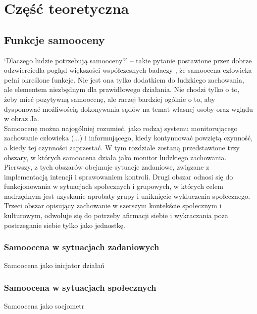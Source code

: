 \documentclass[man]{apa6}
\begin{document}
\section{Część teoretyczna}
\subsection{Funkcje samooceny}

`Dlaczego ludzie potrzebują samooceny?' -- takie pytanie postawione przez \textcite{pyszczynski2004people} dobrze odzwierciedla pogląd większości współczesnych badaczy \parencite[zob. również, ][]{bandura1994self, leary1995self}, że samoocena człowieka pełni określone funkcje. Nie jest ona tylko dodatkiem do ludzkiego zachowania, ale elementem niezbędnym dla prawidłowego działania. Nie chodzi tylko o to, żeby mieć pozytywną samoocenę, ale raczej bardziej ogólnie o to, aby dysponować możliwością dokonywania sądów na temat własnej osoby oraz wglądu w obraz Ja.\\
Samoocenę można najogólniej rozumieć, jako rodzaj systemu monitorującego zachowanie człowieka (...) i informującego, kiedy kontynuować powziętą czynność, a kiedy tej czynności zaprzestać. W tym rozdziale zostaną przedstawione trzy obszary, w których samoocena działa jako monitor ludzkiego zachowania. Pierwszy, z tych obszarów obejmuje sytuacje zadaniowe, związane z implementacją intencji i sprawowaniem kontroli. Drugi obszar odnosi się do funkcjonowania w sytuacjach społecznych i grupowych, w których celem nadrzędnym jest uzyskanie aprobaty grupy i uniknięcie wykluczenia społecznego. Trzeci obszar opisujący zachowanie w szerszym kontekście społecznym i kulturowym, odwołuje się do potrzeby afirmacji siebie i wykraczania poza postrzeganie siebie tylko jako jednostkę.\\

\subsubsection{Samoocena w sytuacjach zadaniowych}

Samoocena jako inicjator działań \parencite{bandura1994self}

\subsubsection{Samoocena w sytuacjach społecznych}

Samoocena jako socjometr \parencite{leary1995self, leary2000nature}
\end{document}
